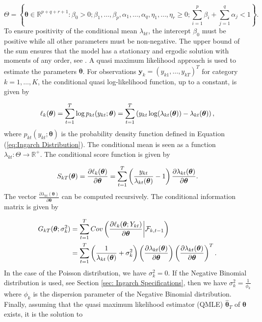 \begin{equation}
\Theta = \left\{ \bm{\theta} \in \mathbb{R}^{p+q+r+1}: \beta_0 > 0; \beta_1,\ldots,\beta_p,\alpha_1,\ldots,\alpha_q,\eta_1,\ldots,\eta_r \geq 0; \sum_{i=1}^p\beta_i + \sum_{j=1}^q\alpha_j < 1 \right\}.
\label{eq:Ingarch parameter space}
\end{equation}
%
To ensure positivity of the conditional mean $\lambda_{kt}$, the intercept $\beta_0$ must be positive while all other parameters must be non-negative. The upper bound of the sum ensures that the model has a stationary and ergodic solution with moments of any order, see \textcite{Ferland:2006,Fokianos:2009,Doukhan:2012}. A quasi maximum likelihood approach is used to estimate the parameters $\bm{\theta}$. 
For observations $\textbf{y}_k = \left(y_{k1},\ldots,y_{kT}\right)^T$ for category $k=1,\ldots,K$, the conditional quasi log-likelihood function, up to a constant, is given by

\begin{equation}
\ell_k(\bm{\theta}) = \sum_{t=1}^T\log p_{kt}(y_{kt};\bm{\theta}) = \sum_{t=1}^T \left(y_{kt}\log(\lambda_{kt}(\bm{\theta})) - \lambda_{kt}(\bm{\theta})\right),
\label{eq: Quasi log likelihood}
\end{equation}
%
where $p_{kt}(y_{kt};\bm{\theta})$ is the probability density function defined in Equation (\ref{eq:Ingarch Distribution}). The conditional mean is seen as a function $\lambda_{kt}: \Theta \rightarrow \mathbb{R}^{+}$. The conditional score function is given by

\begin{equation}
S_{kT}(\bm{\theta}) = \frac{\partial \ell_k(\bm{\theta})}{\partial \bm{\theta}} = \sum_{t=1}^T\left(\frac{y_{kt}}{\lambda_{kt}(\bm{\theta})}-1\right)\frac{\partial\lambda_{kt}(\bm{\theta})}{\partial \bm{\theta}}.
\label{eq:conditional score}
\end{equation}
%
The vector $\frac{\partial\lambda_{kt}(\bm{\theta})}{\partial \bm{\theta}}$ can be computed recursively. 
The conditional information matrix is given by

\begin{equation}
\begin{aligned}
G_{kT}(\bm{\theta};\sigma_k^2) &= \sum_{t=1}^T Cov\left(\frac{\partial \ell_k(\bm{\theta}; Y_{kt})}{\partial \bm{\theta}} \middle| \mathcal{F}_{k,t-1}\right) \\
&=  \sum_{t=1}^T \left(\frac{1}{\lambda_{kt}\left(\bm{\theta}\right)}+\sigma_k^2\right) \left(\frac{\partial \lambda_{kt}(\bm{\theta})}{\partial \bm{\theta}}\right)\left(\frac{\partial \lambda_{kt}(\bm{\theta})}{\partial \bm{\theta}}\right)^T.
\label{eq:conditional information matrix}
\end{aligned}
\end{equation}
%
In the case of the Poisson distribution, we have $\sigma_k^2=0$. If the Negative Binomial distribution is used, see Section \ref{sec: Ingarch Specifications}, then we have $\sigma_k^2=\frac{1}{\phi_k}$ where $\phi_k$ is the dispersion parameter of the Negative Binomial distribution.
Finally, assuming that the quasi maximum likelihood estimator (QMLE) $\hat{\bm{\theta}}_T$ of $\bm{\theta}$ exists, it is the solution to 

